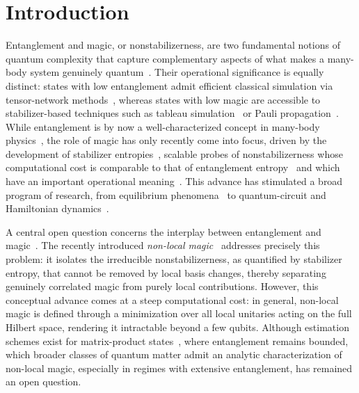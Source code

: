 \documentclass[prx,twocolumn,superscriptaddress,aps,10pt, frontmatterverbose, reprint,footinbib,longbibliography=true]{revtex4-2}
\begin{document}
\section{Introduction}
Entanglement and magic, or nonstabilizerness, are two fundamental notions of quantum complexity that capture complementary aspects of what makes a many-body system genuinely quantum~\cite{Horodecki2009,Chitambar2019resources,Veitch2014resource}.
Their operational significance is equally distinct: states with low entanglement admit efficient classical simulation via tensor-network methods~\cite{Schollw_ck_2011}, whereas states with low magic are accessible to stabilizer-based techniques such as tableau simulation~\cite{Gottesman1998,Bravyi2019simulationofquantum} or Pauli propagation~\cite{dowling2025magic,rudolph2025paulipropagationcomputationalframework}.
While entanglement is by now a well-characterized concept in many-body physics~\cite{Laflorencie_2016,amico2008entanglement}, the role of magic has only recently come into focus, driven by the development of stabilizer entropies~\cite{Leone2022SRE,leone2024stabilizer}, scalable probes of nonstabilizerness whose computational cost is comparable to that of entanglement entropy~\cite{huang2026fastexactapproachstabilizer,xiao2026exponentiallyacceleratedsamplingpauli,sierant2026computingquantummagicstate} and which have an important operational meaning~\cite{Bittel_2026, Iannotti_2026, cusumano2025nonstabilizernessviolationschshinequalities}.
This advance has stimulated a broad program of research, from equilibrium phenomena~\cite{piro2,tarabunga2023manybody,oshino2026stabilizer,hoshino2025stabilizerrenyientropyencodes, aditya2025mpembaeffectsquantumcomplexity} to quantum-circuit and Hamiltonian dynamics~\cite{Turkeshi_2025,odavic2025stabilizer,tirrito2025anticoncentration,falcao2025nonstabilizerness, PhysRevB.106.214316, p8dn-glcw, lio2026quantumstatedesignsmagic, aditya2025growthspreadingquantumresources, Viscardi_2026}.

A central open question concerns the interplay between entanglement and magic~\cite{tirrito2024quantifying,szombathy,Iannotti2025entanglement}.
The recently introduced \emph{non-local magic}~\cite{Cao_2025,qian2025quantumnonlocalnonstabilizerness, munizzi2026magicnoncliffordgatestopological, cao2024non} addresses precisely this problem: it isolates the irreducible nonstabilizerness, as quantified by stabilizer entropy, that cannot be removed by local basis changes, thereby separating genuinely correlated magic from purely local contributions.
However, this conceptual advance comes at a steep computational cost: in general, non-local magic is defined through a minimization over all local unitaries acting on the full Hilbert space, rendering it intractable beyond a few qubits. 
Although estimation schemes exist for matrix-product states~\cite{Cao_2025}, where entanglement remains bounded, which broader classes of quantum matter admit an analytic characterization of non-local magic, especially in regimes with extensive entanglement, has remained an open question.
\end{document}
